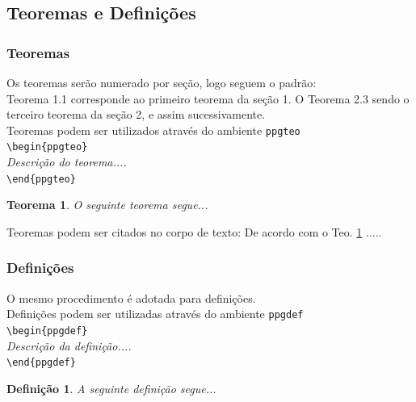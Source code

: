 \documentclass[a4paper,12pt,oneside]{article}
\numberwithin{equation}{section}
\newtheorem{ppgteo}{Teorema}[section]
\newtheorem{ppgdef}{Definição}[section]
\begin{document}
\subsection{Teoremas e Definições}

\subsubsection{Teoremas}
Os teoremas serão numerado por seção, logo seguem o padrão:\\


Teorema 1.1 corresponde ao primeiro teorema da seção 1. O Teorema 2.3 sendo o terceiro teorema da seção 2, e assim sucessivamente.\\


Teoremas podem ser utilizados através do ambiente \texttt{ppgteo}\\

\noindent \texttt{\textbackslash begin\{ppgteo\}}\\
\textit{Descrição do teorema....}\\
\texttt{\textbackslash end\{ppgteo\}}\\

\begin{ppgteo}
O seguinte teorema segue...
\label{teo1}
\end{ppgteo}

Teoremas podem ser citados no corpo de texto: De acordo com o Teo. \ref{teo1} .....\\


\subsubsection{Definições}

O mesmo procedimento é adotada para definições.\\


Definições podem ser utilizadas através do ambiente \texttt{ppgdef}\\

\noindent \texttt{\textbackslash begin\{ppgdef\}}\\
\textit{Descrição da definição....}\\
\texttt{\textbackslash end\{ppgdef\}}

\begin{ppgdef}
A seguinte definição segue...
\label{def1}
\end{ppgdef}
\end{document}
